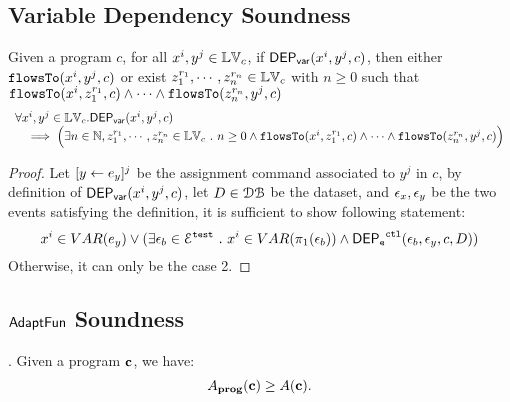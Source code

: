 %
\subsection{Variable Dependency Soundness}
%
\begin{thm}
\label{thm:flowstovardep_sound}
Given a program ${c}$, for all  $ x^i, y^j \in \mathbb{LV}_{{c}}$, if $\mathsf{DEP_{var}}(x^i, y^j, {c})$,
then either $\mathtt{flowsTo}(x^i, y^j, c)$ 
or 
exist $z_1^{r_1}, \cdots, z_n^{r_n} \in \mathbb{LV}_{{c}}$ with $n \geq 0$ such that   
$\mathtt{flowsTo}(x^i,  z_1^{r_1}, c) 
\land \cdots \land \mathtt{flowsTo}(z_n^{r_n}, y^j, c)$
%
\[
\begin{array}{l}
  \forall x^i, y^j \in \mathbb{LV}_{{c}}.
  \mathsf{DEP_{var}}(x^i, y^j, {c})
  \\ \quad \implies
  \Big( \exists n \in \mathbb{N}, z_1^{r_1}, \cdots, z_n^{r_n} \in \mathbb{LV}_{{c}} ~.~ n \geq 0 \land
  \mathtt{flowsTo}(x^i,  z_1^{r_1}, c) 
  \land \cdots \land \mathtt{flowsTo}(z_n^{r_n}, y^j, c) \Big)
\end{array}
\]
\end{thm}
\begin{proof}
Let $[\mathrel{ y \leftarrow e_y }]^j$ be the assignment command associated to $y^j$ in $c$,
by definition of $\mathsf{DEP_{var}}(x^i, y^j, {c})$, let $D \in \mathcal{DB}$ be the dataset,
and $\mathtt{\epsilon}_x, \mathtt{\epsilon}_y$ be the two events satisfying the definition,
it is sufficient to show following statement:
    $$
    x^i \in VAR(e_y)
    \lor 
    (\exists \mathtt{\epsilon}_b \in \mathcal{E}^{\mathtt{{test}}} ~.~ x^i \in VAR(\pi_1(\mathtt{\epsilon}_b)) 
    \land \mathsf{DEP_{\mathtt{e}}}^{\mathtt{{ctl}}}(\mathtt{\epsilon}_b, \mathtt{\epsilon}_y, c, D))
    $$
Otherwise, it can only be the case 2.
\end{proof}

\subsection{$\textsf{AdaptFun}$ Soundness}
{
  \begin{thm}.
  Given a program ${\boldsymbol{\mathbf{c}}}$, we have:
  \[
  A_{\bf{prog}}({\boldsymbol{\mathbf{c}}}) \geq A({\boldsymbol{\mathbf{c}}}).
  \]
  \end{thm}
}

